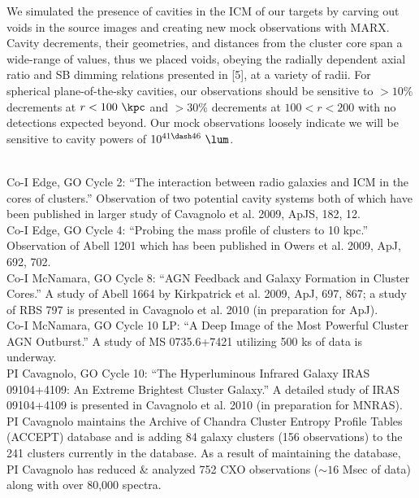\documentclass[letterpaper,11pt]{article}
\begin{document}
We simulated the presence of cavities in the ICM of our targets by
carving out voids in the source images and creating new mock
observations with MARX. Cavity decrements, their geometries, and
distances from the cluster core span a wide-range of values, thus we
placed voids, obeying the radially dependent axial ratio and SB
dimming relations presented in [5], at a variety of radii. For
spherical plane-of-the-sky cavities, our observations should be
sensitive to $> 10\%$ decrements at $r < 100 ~\kpc$ and $> 30\%$
decrements at $100 < r < 200$ with no detections expected beyond. Our
mock observations loosely indicate we will be sensitive to cavity
powers of $10^{41 \dash 46} ~\lum$.\\

\small
\noindent 
\normalsize

\clearpage
{}\\

Co-I Edge, GO Cycle 2: ``The interaction between radio galaxies and
ICM in the cores of clusters.'' Observation of two potential cavity
systems both of which have been published in larger study of Cavagnolo
et al. 2009, ApJS, 182, 12.\\

Co-I Edge, GO Cycle 4: ``Probing the mass profile of clusters to 10
kpc.'' Observation of Abell 1201 which has been published in Owers et
al. 2009, ApJ, 692, 702.\\

Co-I McNamara, GO Cycle 8: ``AGN Feedback and Galaxy Formation in
Cluster Cores.'' A study of Abell 1664 by Kirkpatrick et al. 2009,
ApJ, 697, 867; a study of RBS 797 is presented in Cavagnolo et
al. 2010 (in preparation for ApJ).\\

Co-I McNamara, GO Cycle 10 LP: ``A Deep Image of the Most Powerful
Cluster AGN Outburst.'' A study of MS 0735.6+7421 utilizing 500 ks of
data is underway.\\

PI Cavagnolo, GO Cycle 10: ``The Hyperluminous Infrared Galaxy IRAS
09104+4109: An Extreme Brightest Cluster Galaxy.'' A detailed study of
IRAS 09104+4109 is presented in Cavagnolo et al. 2010 (in preparation
for MNRAS).\\

PI Cavagnolo maintains the Archive of Chandra Cluster Entropy Profile
Tables (ACCEPT) database and is adding 84 galaxy clusters (156
observations) to the 241 clusters currently in the database. As a
result of maintaining the database, PI Cavagnolo has reduced \&
analyzed 752 CXO observations ($\sim 16$ Msec of data) along with over
80,000 spectra.
\end{document}
